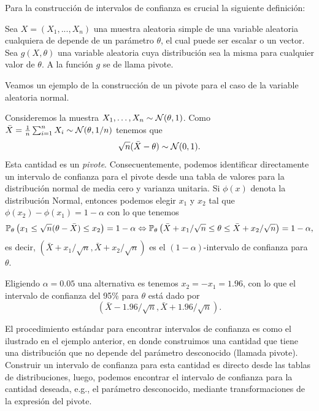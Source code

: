 Para la construcción de intervalos de confianza es crucial la siguiente definición:

\begin{definition}[Pivote]

Sea $X=(X_1,...,X_n)$ una muestra aleatoria simple de una variable aleatoria cualquiera de depende de un parámetro $\theta$, el cual puede ser escalar o un vector. Sea $g(X,\theta)$ una variable aleatoria cuya distribución sea la misma para cualquier valor de $\theta$. A la función $g$ se de llama pivote.

\end{definition}

Veamos un ejemplo de la construcción de un pivote para el caso de la variable aleatoria normal.

\begin{example}
	Consideremos la muestra $X_1,\ldots,X_n\sim{\mathcal N}(\theta,1)$. Como $\bar{X}=\frac{1}{n}\sum_{i=1}^nX_i\sim{\mathcal N}(\theta,1/n)$ tenemos que  
	\begin{equation}
			\sqrt{n}(\bar{X}-\theta)\sim{\mathcal N}(0,1).
		\end{equation}	
	Esta cantidad es un \emph{pivote}. Consecuentemente, podemos identificar directamente un intervalo de confianza para el pivote desde una tabla de valores para la distribución normal de media cero y varianza unitaria. Si $\phi(x)$ denota la distribución Normal, entonces podemos elegir  $x_1$ y $x_2$ tal que $\phi(x_2)-\phi(x_1) = 1-\alpha$ con lo que tenemos
	\begin{equation}
	 	\mathbb{P}_\theta \left(x_1 \leq \sqrt{n}(\theta-\bar{X}) \leq x_2\right) = 1-\alpha \Leftrightarrow \mathbb{P}_\theta \left(\bar{X} + x_1/\sqrt{n} \leq \theta \leq \bar{X} + x_2/\sqrt{n}\right) = 1-\alpha,
	 \end{equation} 
	 es decir, $(\bar{X} + x_1/\sqrt{n},\bar{X} + x_2/\sqrt{n})$ es el $(1-\alpha)$-intervalo de confianza para $\theta$. 
	 
	 Eligiendo $\alpha=0.05$ una alternativa es tenemos $x_2 = -x_1 =1.96$, con lo que el intervalo de confianza del 95\% para $\theta$ está dado por 
	 \begin{equation}
	 	(\bar{X} -1.96/\sqrt{n},\bar{X} + 1.96/\sqrt{n}).
	 \end{equation}

	 El procedimiento estándar para encontrar intervalos de confianza es como el ilustrado en el ejemplo anterior, en donde construimos una cantidad que tiene una distribución que no depende del parámetro desconocido (llamada pivote). Construir un intervalo de confianza para esta cantidad es directo desde las tablas de distribuciones, luego, podemos encontrar el intervalo de confianza para la cantidad deseada, e.g., el parámetro desconocido, mediante transformaciones de la expresión del pivote. 


\end{example}

